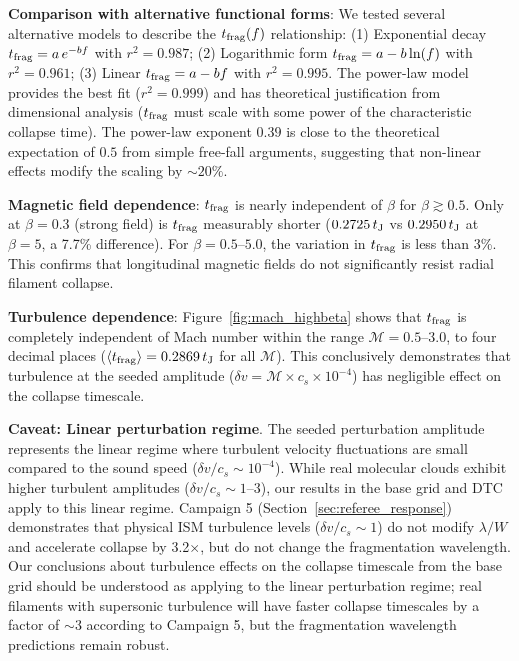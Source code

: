 \documentclass[twoside,twocolumn]{mnras}
\begin{document}
\textbf{Comparison with alternative functional forms}: We tested several alternative models to describe the $t_{\rm frag}(f)$ relationship: (1) Exponential decay $t_{\rm frag} = a\,e^{-bf}$ with $r^2 = 0.987$; (2) Logarithmic form $t_{\rm frag} = a - b\ln(f)$ with $r^2 = 0.961$; (3) Linear $t_{\rm frag} = a - bf$ with $r^2 = 0.995$. The power-law model provides the best fit ($r^2 = 0.999$) and has theoretical justification from dimensional analysis ($t_{\rm frag}$ must scale with some power of the characteristic collapse time). The power-law exponent $0.39$ is close to the theoretical expectation of $0.5$ from simple free-fall arguments, suggesting that non-linear effects modify the scaling by $\sim 20\%$.

\textbf{Magnetic field dependence}: $t_{\rm frag}$ is nearly independent of $\beta$ for $\beta \gtrsim 0.5$. Only at $\beta = 0.3$ (strong field) is $t_{\rm frag}$ measurably shorter ($0.2725\,t_{\rm J}$ vs $0.2950\,t_{\rm J}$ at $\beta = 5$, a 7.7\% difference). For $\beta = 0.5$--$5.0$, the variation in $t_{\rm frag}$ is less than 3\%. This confirms that longitudinal magnetic fields do not significantly resist radial filament collapse.

\textbf{Turbulence dependence}: Figure~\ref{fig:mach_highbeta} shows that $t_{\rm frag}$ is completely independent of Mach number within the range $\mathcal{M} = 0.5$--$3.0$, to four decimal places ($\langle t_{\rm frag} \rangle = 0.2869\,t_{\rm J}$ for all $\mathcal{M}$). This conclusively demonstrates that turbulence at the seeded amplitude ($\delta v = \mathcal{M} \times c_s \times 10^{-4}$) has negligible effect on the collapse timescale.

\textbf{Caveat: Linear perturbation regime}. The seeded perturbation amplitude represents the linear regime where turbulent velocity fluctuations are small compared to the sound speed ($\delta v/c_s \sim 10^{-4}$). While real molecular clouds exhibit higher turbulent amplitudes ($\delta v/c_s \sim 1$--$3$), our results in the base grid and DTC apply to this linear regime. Campaign 5 (Section~\ref{sec:referee_response}) demonstrates that physical ISM turbulence levels ($\delta v/c_s \sim 1$) do not modify $\lambda/W$ and accelerate collapse by 3.2$\times$, but do not change the fragmentation wavelength. Our conclusions about turbulence effects on the collapse timescale from the base grid should be understood as applying to the linear perturbation regime; real filaments with supersonic turbulence will have faster collapse timescales by a factor of $\sim$3 according to Campaign 5, but the fragmentation wavelength predictions remain robust.
\end{document}
